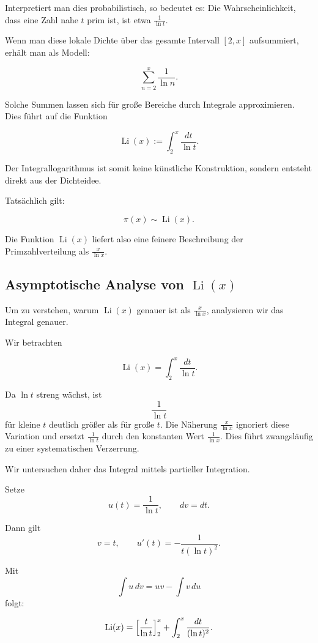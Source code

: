 \documentclass[../Mathe_Aufgaben.tex]{subfiles}
\begin{document}
Interpretiert man dies probabilistisch,
so bedeutet es:
Die Wahrscheinlichkeit, dass eine Zahl nahe $t$ prim ist,
ist etwa $\frac{1}{\ln t}$.

Wenn man diese lokale Dichte über das gesamte Intervall $[2,x]$
aufsummiert, erhält man als Modell:

\[
\sum_{n=2}^{x}\frac{1}{\ln n}.
\]

Solche Summen lassen sich für große Bereiche durch Integrale
approximieren. Dies führt auf die Funktion

\[
\operatorname{Li}(x):=\int_2^x\frac{dt}{\ln t}.
\]

Der Integrallogarithmus ist somit keine künstliche Konstruktion,
sondern entsteht direkt aus der Dichteidee.

Tatsächlich gilt:

\[
\pi(x)\sim \operatorname{Li}(x).
\]

Die Funktion $\operatorname{Li}(x)$ liefert also eine feinere
Beschreibung der Primzahlverteilung als $\frac{x}{\ln x}$.

\bigskip

\subsection*{Asymptotische Analyse von $\operatorname{Li}(x)$}

Um zu verstehen, warum $\operatorname{Li}(x)$ genauer ist als
$\frac{x}{\ln x}$, analysieren wir das Integral genauer.

Wir betrachten

\[
\operatorname{Li}(x)=\int_2^x\frac{dt}{\ln t}.
\]

Da $\ln t$ streng wächst, ist
\[
\frac{1}{\ln t}
\]
für kleine $t$ deutlich größer als für große $t$.
Die Näherung $\frac{x}{\ln x}$ ignoriert diese Variation
und ersetzt $\frac{1}{\ln t}$ durch den konstanten Wert
$\frac{1}{\ln x}$.
Dies führt zwangsläufig zu einer systematischen Verzerrung.

\medskip

Wir untersuchen daher das Integral mittels partieller Integration.

Setze
\[
u(t)=\frac{1}{\ln t},
\qquad dv=dt.
\]

Dann gilt
\[
v=t,
\qquad
u'(t)=-\frac{1}{t(\ln t)^2}.
\]

Mit
\[
\int u\,dv = uv-\int v\,du
\]
folgt:

\[
\operatorname{Li}(x)
=
\Bigl[\frac{t}{\ln t}\Bigr]_2^x
+
\int_2^x\frac{dt}{(\ln t)^2}.
\]
\end{document}
